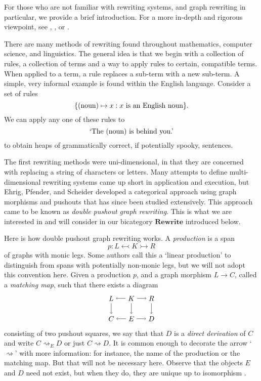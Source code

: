 \documentclass[11pt]{amsart}
\newcommand{\cat}[1]{\mathbf{#1}}
\renewcommand{\t}[1]{\textup{#1}}
\theoremstyle{remark}
\theoremstyle{definition}
\begin{document}
For those who are not familiar with rewriting systems, and graph rewriting in particular, we provide a brief introduction. For a more in-depth and rigorous viewpoint, see \cite{Baader_TermRewritingAllThat}, \cite{Ehrig_GraphGramAlgAp}, or \cite{LackSoboc_AdhesiveCategories}.

There are many methods of rewriting found throughout mathematics, computer science, and linguistics. The general idea is that we begin with a collection of rules, a collection of terms and a way to apply rules to certain, compatible terms.  When applied to a term, a rule replaces a sub-term with a new sub-term. A simple, very informal example is found within the English language.  Consider a set of rules 
\[
\{ \t{(noun)} \mapsto x : x \t{ is an 
	English noun} \}.
\]
We can apply any one of these rules to
\[
\t{`The (noun) is behind you.'}
\] 
to obtain heaps of grammatically correct, if potentially spooky, sentences.  

The first rewriting methods were uni-dimensional, in that they are concerned with replacing a string of characters or letters. Many attempts to define multi-dimensional rewriting systems came up short in application and execution, but Ehrig, Pfender, and Scheider developed a categorical approach using graph morphisms and pushouts  \cite{Ehrig_GraphGramAlgAp} that has since been studied extensively. This approach came to be known as \textit{double pushout graph rewriting}. This is what we are interested in and will consider in our bicategory $\cat{Rewrite}$ introduced below.

Here is how double pushout graph rewriting works. A \emph{production} is a span 
\[
p: L \leftarrowtail K \rightarrowtail R
\] 
of graphs with monic legs. Some authors call this a `linear production' to distinguish from spans with potentially non-monic legs, but we will not adopt this convention here. Given a production $p$, and a graph morphism $L \to C$, called a \emph{matching map}, such that there exists a diagram
%
\begin{equation}
\label{diag:derivation}
\begin{tikzpicture}[baseline=(current  bounding  box.center)]
	\node (L) at (-1,1) {$L$};
	\node (K) at (0,1) {$K$};
	\node (R) at (1,1) {$R$};
	\node (C) at (-1,0) {$C$};
	\node (E) at (0,0) {$E$};
	\node (D) at (1,0) {$D$};
	\draw [->] (K) edge (L);
	\draw [->] (K) edge (E);
	\draw [->] (K) edge (R);
	\draw [->] (E) edge (C);
	\draw [->] (E) edge (D);
	\draw [->] (L) edge (C);
	\draw [->] (R) edge (D);
\end{tikzpicture}
\end{equation}
%
consisting of two pushout squares, we say that that $D$ is a \emph{direct derivation} of $C$ and write $C \rightsquigarrow_E D$ or just $C \rightsquigarrow D$. It is common enough to decorate the arrow `$\rightsquigarrow$' with more information: for instance, the name of the production or the matching map.  But that will not be necessary here. Observe that the objects $E$ and $D$ need not exist, but when they do, they are unique up to isomorphism \cite[Lemma 4.5]{LackSoboc_AdhesiveCategories}. 
\end{document}
